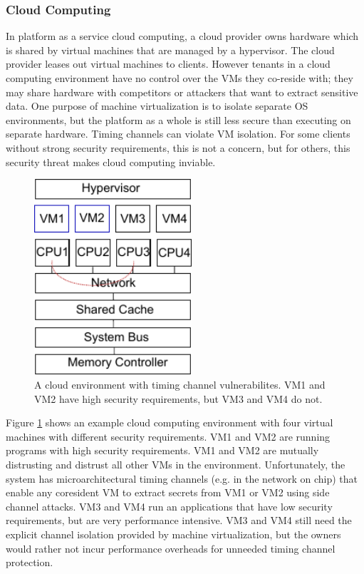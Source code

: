 \subsubsection{Cloud Computing}
In platform as a service cloud computing, a cloud provider owns hardware which 
is shared by virtual machines that are managed by a hypervisor. The cloud 
provider leases out virtual machines to clients. However tenants in a cloud 
computing environment have no control over the VMs they co-reside with; they 
may share hardware with competitors or attackers that want to extract sensitive 
data. One purpose of machine virtualization is to isolate separate OS 
environments, but the platform as a whole is still less secure than executing 
on separate hardware. Timing channels can violate VM isolation. For some 
clients without strong security requirements, this is not a concern, but for 
others, this security threat makes cloud computing inviable.

    \begin{figure}
        \begin{center}
            \includegraphics[width=2.3in]{figs/cloud_scenario.pdf}
            \caption{A cloud environment with timing channel vulnerabilites. 
             VM1 and VM2 have high security requirements, but VM3 and VM4 do 
             not.}
            \label{fig:cloud_scenario}
        \end{center}
    \end{figure}

Figure \ref{fig:cloud_scenario} shows an example cloud computing environment 
with four virtual machines with different security requirements. VM1 and VM2 
are running programs with high security requirements. VM1 and VM2 are mutually 
distrusting and distrust all other VMs in the environment. Unfortunately, the 
system has microarchitectural timing channels (e.g. in the network on chip) 
that enable any coresident VM to extract secrets from VM1 or VM2 using side 
channel attacks. VM3 and VM4 run an applications that have low security 
requirements, but are very performance intensive. VM3 and VM4 still need the 
explicit channel isolation provided by machine virtualization, but the owners 
would rather not incur performance overheads for unneeded timing channel 
protection.

